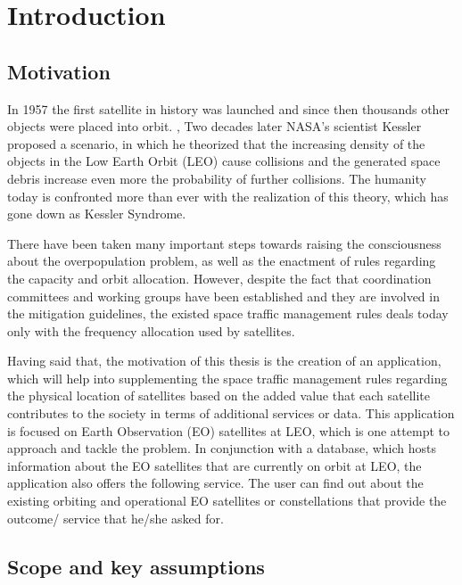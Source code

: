 \chapter{Introduction}
\label{chap:1}

\section{Motivation}
\bigskip
\bigskip

In 1957 the first satellite in history was launched and since then thousands other objects were placed into orbit. \cite{Belward 2015}, \cite{ESA 2019} Two decades later NASA’s scientist Kessler proposed a scenario, in which he theorized that the increasing density of the objects in the Low Earth Orbit (LEO) cause collisions and the generated space debris increase even more the probability of further collisions. The humanity today is confronted more than ever with the realization of this theory, which has gone down as Kessler Syndrome.

There have been taken many important steps towards raising the consciousness about the overpopulation problem, as well as the enactment of rules regarding the capacity and orbit allocation. However, despite the fact that coordination committees and working groups have been established and they are involved in the mitigation guidelines, the existed space traffic management rules deals today only with the frequency allocation used by satellites.

Having said that, the motivation of this thesis is the creation of an application, which will help into supplementing the space traffic management rules regarding the physical location of satellites based on the added value that each satellite contributes to the society in terms of additional services or data. This application is focused on Earth Observation (EO) satellites at LEO, which is one attempt to approach and tackle the problem. In conjunction with a database, which hosts information about the EO satellites that are currently on orbit at LEO, the application also offers the following service. The user can find out about the existing orbiting and operational EO satellites or constellations that provide the outcome/ service that he/she asked for.

\bigskip
\bigskip

\newpage
\section{Scope and key assumptions}
\bigskip


